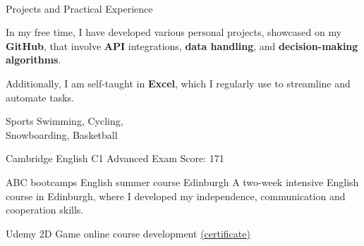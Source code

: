 \begin{leftcolumn}
     \\
     \\
     \\
     \\
     \\
     \\

    \vfill\null
    
    
    \newpage
    
    \cvmetaevent
    {Projects and Practical Experience}
    {}
    {}
    {In my free time, I have developed various personal projects, showcased on my \textbf{GitHub}, that involve \textbf{API} integrations, \textbf{data handling}, and \textbf{decision-making algorithms}.
    
    Additionally, I am self-taught in \textbf{Excel}, which I regularly use to streamline and automate tasks.
    }
    
    \cvmetaevent
    {Sports}
    {}
    {}
    {Swimming, Cycling, \\Snowboarding, Basketball}
    
    \vfill\null
    
    \cvmetaevent
    {Cambridge English}
    {C1 Advanced Exam}
    {}
    {Score: 171}
    
    \cvmetaevent
    {ABC bootcamps}
    {English summer course}
    {Edinburgh}
    {A two-week intensive English course in Edinburgh, where I developed my independence, communication and cooperation skills.}
    
    \cvmetaevent
    {Udemy}
    {2D Game online course development}
    {}
    {\textcolor{maincol}{\href{https://udemy-certificate.s3.amazonaws.com/pdf/UC-d7553e16-cd48-4367-a447-73e2f10a2d3a.pdf}{(certificate)}}}
    
    
    \end{leftcolumn}